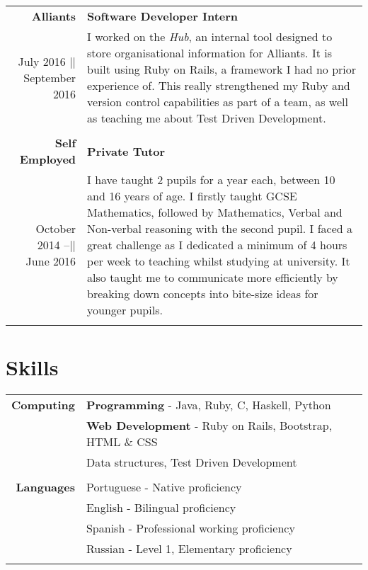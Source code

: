 \documentclass[a4paper,10pt]{article}
\begin{document}
	\begin{tabular}{ r |p{10cm}}
		
		\large{\textbf{Alliants}} & \textbf{Software Developer Intern}
		\\
		July 2016 || September 2016 & I worked on the \textit{Hub}, an internal tool designed to store organisational information for Alliants. It is built using Ruby on Rails, a framework I had no prior experience of. This really strengthened my Ruby and version control capabilities as part of a team, as well as teaching me about Test Driven Development.
		\\\multicolumn{2}{c}{} \\
		
		\large{\textbf{Self Employed}} & \textbf{Private Tutor}
		 \\		
		 October 2014 –|| June 2016 & I have taught 2 pupils for a year each, between 10 and 16 years of age. I firstly taught GCSE Mathematics, followed by Mathematics, Verbal and Non-verbal reasoning with the second pupil. I faced a great challenge as I dedicated a minimum of 4 hours per week to teaching whilst studying at university. It also taught me to communicate more efficiently by breaking down concepts into bite-size ideas for younger pupils.
		\\\multicolumn{2}{c}{} \\

			
	\end{tabular}
	
	\section*{Skills}
	
	\begin{tabular}{r|p{12cm}}	
		\textbf{Computing}	 & \textbf{Programming} - Java, Ruby, C, Haskell, Python \\&
		\textbf{Web Development} - Ruby on Rails, Bootstrap, HTML \& CSS \\&
		Data structures, Test Driven Development
		 \\\multicolumn{2}{c}{} \\
		\textbf{Languages} & Portuguese - Native proficiency \\&
		English - Bilingual proficiency \\&
		Spanish - Professional working proficiency \\&
		Russian - Level 1, Elementary proficiency \\\multicolumn{2}{c}{} \\

		
	\end{tabular}
	
\end{document}
